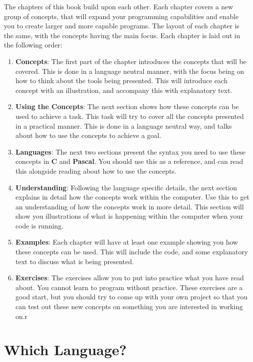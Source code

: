 The chapters of this book build upon each other. Each chapter covers a new group of concepts, that will expand your programming capabilities and enable you to create larger and more capable programs. The layout of each chapter is the same, with the concepts having the main focus. Each chapter is laid out in the following order:
\begin{enumerate}
  \item \textbf{Concepts}: The first part of the chapter introduces the concepts that will be covered. This is done in a language neutral manner, with the focus being on how to think about the tools being presented. This will introduce each concept with an illustration, and accompany this with explanatory text.
  \item \textbf{Using the Concepts}: The next section shows how these concepts can be used to achieve a task. This task will try to cover all the concepts presented in a practical manner. This is done in a language neutral way, and talks about how to use the concepts to achieve a goal.
  \item \textbf{Languages}: The next two sections present the syntax you need to use these concepts in \textbf{C} and \textbf{Pascal}. You should use this as a reference, and can read this alongside reading about how to use the concepts.
  \item \textbf{Understanding}: Following the language specific details, the next section explains in detail how the concepts work within the computer. Use this to get an understanding of how the concepts work in more detail. This section will show you illustrations of what is happening within the computer when your code is running.
  \item \textbf{Examples}: Each chapter will have at least one example showing you how these concepts can be used. This will include the code, and some explanatory text to discuss what is being presented.
  \item \textbf{Exercises}: The exercises allow you to put into practice what you have read about. You cannot learn to program without practice. These exercises are a good start, but you should try to come up with your own project so that you can test out these new concepts on something you are interested in working on.r
\end{enumerate}

\section*{Which Language?} %
\label{sec:which_language_}

